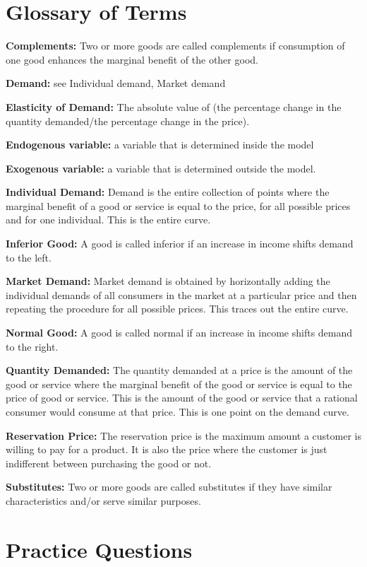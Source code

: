 \documentclass[
]{book}
\begin{document}
\hypertarget{glossary-of-terms-4}{%
\section{Glossary of Terms}\label{glossary-of-terms-4}}

\textbf{Complements:} Two or more goods are called complements if consumption of one good enhances the marginal benefit of the other good.

\textbf{Demand:} see Individual demand, Market demand

\textbf{Elasticity of Demand:} The absolute value of (the percentage change in the quantity demanded/the percentage change in the price).

\textbf{Endogenous variable:} a variable that is determined inside the model

\textbf{Exogenous variable:} a variable that is determined outside the model.

\textbf{Individual Demand:} Demand is the entire collection of points where the marginal benefit of a good or service is equal to the price, for all possible prices and for one individual. This is the entire curve.

\textbf{Inferior Good:} A good is called inferior if an increase in income shifts demand to the left.

\textbf{Market Demand:} Market demand is obtained by horizontally adding the individual demands of all consumers in the market at a particular price and then repeating the procedure for all possible prices. This traces out the entire curve.

\textbf{Normal Good:} A good is called normal if an increase in income shifts demand to the right.

\textbf{Quantity Demanded:} The quantity demanded at a price is the amount of the good or service where the marginal benefit of the good or service is equal to the price of good or service. This is the amount of the good or service that a rational consumer would consume at that price. This is one point on the demand curve.

\textbf{Reservation Price:} The reservation price is the maximum amount a customer is willing to pay for a product. It is also the price where the customer is just indifferent between purchasing the good or not.

\textbf{Substitutes:} Two or more goods are called substitutes if they have similar characteristics and/or serve similar purposes.

\hypertarget{practice-questions-4}{%
\section{Practice Questions}\label{practice-questions-4}}
\end{document}
